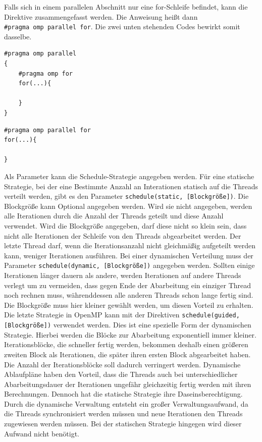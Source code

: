\documentclass[../main.tex]{subfiles}
\begin{document}
Falls sich in einem parallelen Abschnitt nur eine for-Schleife befindet, kann die Direktive zusammengefasst werden. Die Anweisung heißt dann \texttt{\#pragma\ omp\ parallel\ for}. Die zwei unten stehenden Codes bewirkt somit dasselbe.

\begin{lstlisting}
#pragma omp parallel
{
	#pragma omp for
	for(...){
	
	}
}
\end{lstlisting}


\begin{lstlisting}
#pragma omp parallel for
for(...){

}
\end{lstlisting}

Als Parameter kann die Schedule-Strategie angegeben werden. Für eine statische Strategie, bei der eine Bestimmte Anzahl an Interationen statisch auf die Threads verteilt werden, gibt es den Parameter \texttt{schedule(static, [Blockgröße])}. Die Blockgröße kann Optional angegeben werden. Wird sie nicht angegeben, werden alle Iterationen durch die Anzahl der Threads geteilt und diese Anzahl verwendet. Wird die Blockgröße angegeben, darf diese nicht so klein sein, dass nicht alle Iterationen der Schleife von den Threads abgearbeitet werden. Der letzte Thread darf, wenn die Iterationsanzahl nicht gleichmäßig aufgeteilt werden kann, weniger Iterationen ausführen.
Bei einer dynamischen Verteilung muss der Parameter \texttt{schedule(dynamic, [Blockgröße])} angegeben werden. Sollten einige Iterationen länger dauern als andere, werden Iterationen auf andere Threads verlegt um zu vermeiden, dass gegen Ende der Abarbeitung ein einziger Thread noch rechnen muss, währenddessen alle anderen Threads schon lange fertig sind. Die Blockgröße muss hier kleiner gewählt werden, um diesen Vorteil zu erhalten.
Die letzte Strategie in OpenMP kann mit der Direktiven \texttt{schedule(guided, [Blockgröße])} verwendet werden. Dies ist eine spezielle Form der dynamischen Strategie. Hierbei werden die Blöcke zur Abarbeitung exponentiell immer kleiner. Iterationsblöcke, die schneller fertig werden, bekommen deshalb einen größeren zweiten Block als Iterationen, die später ihren ersten Block abgearbeitet haben. Die Anzahl der Iterationsblöcke soll dadurch verringert werden.
Dynamische Ablaufpläne haben den Vorteil, dass die Threads auch bei unterschiedlicher Abarbeitungsdauer der Iterationen ungefähr gleichzeitig fertig werden mit ihren Berechnungen. Dennoch hat die statische Strategie ihre Daseinsberechtigung. Durch die dynamische Verwaltung entsteht ein großer Verwaltungsaufwand, da die Threads synchronisiert werden müssen und neue Iterationen den Threads zugewiesen werden müssen. Bei der statischen Strategie hingegen wird dieser Aufwand nicht benötigt.
\end{document}
